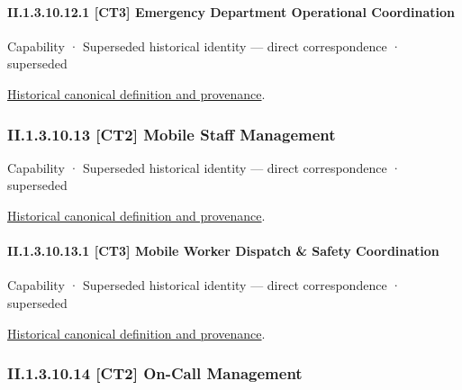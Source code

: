 \paragraph*{II.1.3.10.12.1 [CT3] Emergency Department Operational Coordination}
\label{navigation:II.1.3.10.12.1}

\label{element:15b6d2518e60444098b7c546ca31c49b}
{\small Capability · Superseded historical identity — direct correspondence · superseded}\par
\href{../../../../continuum/strategy/capability/15b6d2518e60444098b7c546ca31c49b.md}{Historical canonical definition and provenance}.\par
\subsubsection*{II.1.3.10.13 [CT2] Mobile Staff Management}
\label{navigation:II.1.3.10.13}

\label{element:32118856636f400a95fc28daacea61c8}
{\small Capability · Superseded historical identity — direct correspondence · superseded}\par
\href{../../../../continuum/strategy/capability/32118856636f400a95fc28daacea61c8.md}{Historical canonical definition and provenance}.\par
\paragraph*{II.1.3.10.13.1 [CT3] Mobile Worker Dispatch \& Safety Coordination}
\label{navigation:II.1.3.10.13.1}

\label{element:5aafd1f4bff046b2b532c20dfb191473}
{\small Capability · Superseded historical identity — direct correspondence · superseded}\par
\href{../../../../continuum/strategy/capability/5aafd1f4bff046b2b532c20dfb191473.md}{Historical canonical definition and provenance}.\par
\subsubsection*{II.1.3.10.14 [CT2] On-Call Management}
\label{navigation:II.1.3.10.14}

